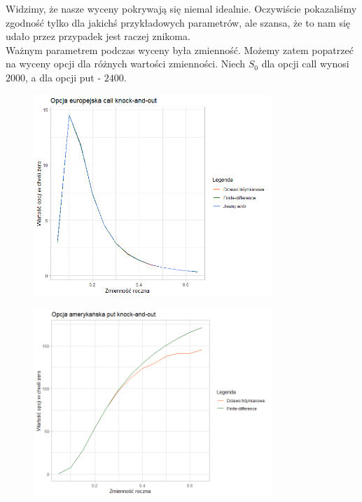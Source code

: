 \documentclass[12pt]{article}
\begin{document}
Widzimy, że nasze wyceny pokrywają się niemal idealnie. Oczywiście pokazaliśmy zgodność tylko dla jakichś przykładowych parametrów, ale szansa, że to nam się udało przez przypadek jest raczej znikoma. \\

Ważnym parametrem podczas wyceny była zmienność. Możemy zatem popatrzeć na wyceny opcji dla różnych wartości zmienności. Niech \(S_{0}\) dla opcji call wynosi \(2000\), a dla opcji put - \(2400\).

\begin{figure}[H]
    \centering
    \includegraphics[width=0.8\textwidth,height=\textheight,keepaspectratio]{ec_sig_porownanie.png}
    \label{fig:ecs}
\end{figure}

\begin{figure}[H]
    \centering
    \includegraphics[width=0.8\textwidth,height=\textheight,keepaspectratio]{ap_sigma.png}
    \label{fig:aps}
\end{figure}
\end{document}
